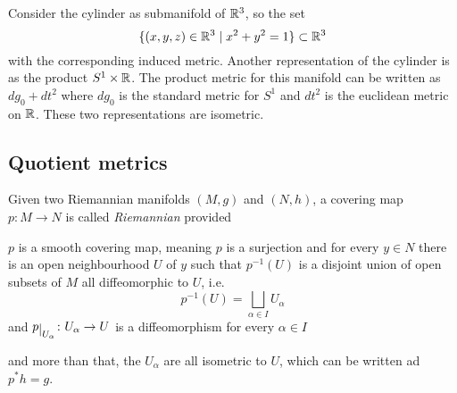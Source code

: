 \documentclass[12pt,twoside]{book}
\begin{document}
\begin{example}
	Consider the cylinder as submanifold of \( \mathbb{R}^3 \), so the set
	\begin{equation*}
		\{ (x,y,z) \in \mathbb{R}^3 \mid x^2 + y^2 = 1 \} \subset \mathbb{R}^3
	\end{equation*}
	with the corresponding induced metric. Another representation of the cylinder is as the
	product \( S^1 \times \mathbb{R} \). The product metric for this manifold can be written as \(
	dg_0 + dt^2 \) where \( dg_0 \) is the standard metric for \( S^1 \) and \( dt^2 \) is
	the euclidean metric on \( \mathbb{R} \). These two representations are isometric. 
\end{example}

\subsection{Quotient metrics}

\begin{definition}
	Given two Riemannian manifolds \( (M,g) \) and \( (N,h) \), a covering map \( p \colon M
	\to N \) is called \emph{Riemannian} provided
	\begin{points}
	\item \( p \) is a smooth covering map, meaning \( p \) is a surjection and for every \( y \in
		N \) there is an open neighbourhood \( U \) of \( y \) such that \( p^{-1}(U) \) is a
		disjoint union of open subsets of \( M \) all diffeomorphic to \( U \), i.e.
		\begin{equation*}
			p^{-1}(U) = \bigsqcup_{\alpha \in I} U_\alpha
		\end{equation*}
		and \( p\rest{U_\alpha} \colon U_\alpha \to U \) is a diffeomorphism for every \( \alpha \in I \) 
	\item and more than that, the \( U_\alpha \) are all isometric to \( U \), which can be
		written ad \( p^\ast h = g \). 
	\end{points}
\end{definition}
\end{document}
